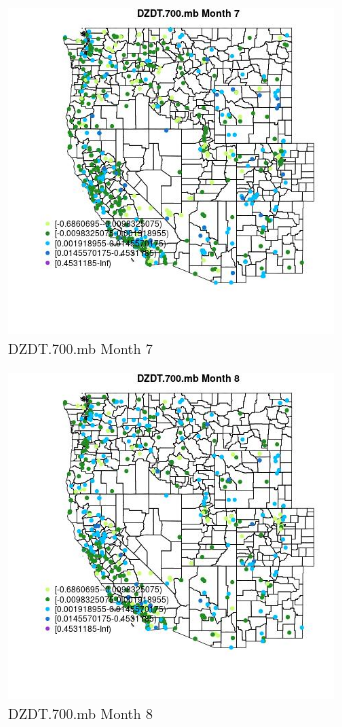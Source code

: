 \begin{figure} 
\centering  
\includegraphics[width=0.77\textwidth]{Code_Outputs/Report_ML_input_PM25_Step4_part_e_de_duplicated_aves_compiled_2019-05-14wNAs_MapObsMo7DZDT700mb.jpg} 
\caption{\label{fig:Report_ML_input_PM25_Step4_part_e_de_duplicated_aves_compiled_2019-05-14wNAsMapObsMo7DZDT700mb}DZDT.700.mb Month 7} 
\end{figure} 
 

\begin{figure} 
\centering  
\includegraphics[width=0.77\textwidth]{Code_Outputs/Report_ML_input_PM25_Step4_part_e_de_duplicated_aves_compiled_2019-05-14wNAs_MapObsMo8DZDT700mb.jpg} 
\caption{\label{fig:Report_ML_input_PM25_Step4_part_e_de_duplicated_aves_compiled_2019-05-14wNAsMapObsMo8DZDT700mb}DZDT.700.mb Month 8} 
\end{figure} 
 

